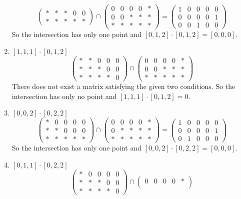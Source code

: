 \documentclass[letterpaper, 12pt]{article}
\begin{document}
\begin{solution}
\begin{enumerate}[(1)]
\[\begin{pmatrix}
   *&*&*&0&0\\
   *&*&*&*&*
\end{pmatrix}\cap \begin{pmatrix}
   0&0&0&0&*\\
   0&0&*&*&*\\ 
   *&*&*&*&*
\end{pmatrix}=\begin{pmatrix}
   1&0&0&0&0\\ 
   0&0&0&0&1\\ 
   0&0&1&0&0
\end{pmatrix}\]
So the intersection has only one point and \([0,1,2]\cdot [0,1,2]=[0,0,0]\).
\item \([1,1,1]\cdot [0,1,2]\)
\[\begin{pmatrix}
   *&*&0&0&0\\ 
   *&*&*&0&0\\
   *&*&*&*&0
\end{pmatrix}\cap \begin{pmatrix}
   0&0&0&0&*\\
   0&0&*&*&*\\ 
   *&*&*&*&*
\end{pmatrix}\]
There does not exist a matrix satisfying the given two conditions. So the intersection has only no point and \([1,1,1]\cdot [0,1,2]=0\).
\item \([0,0,2]\cdot [0,2,2]\)
\[\begin{pmatrix}
   *&0&0&0&0\\ 
   *&*&0&0&0\\
   *&*&*&*&*
\end{pmatrix}\cap \begin{pmatrix}
   0&0&0&0&*\\
   0&*&*&*&*\\ 
   *&*&*&*&*
\end{pmatrix}=\begin{pmatrix}
   1&0&0&0&0\\ 
   0&0&0&0&1\\ 
   0&1&0&0&0
\end{pmatrix}\]
So the intersection has only one point and \([0,0,2]\cdot [0,2,2]=[0,0,0]\).
\item \([0,1,1]\cdot [0,2,2]\)
\[\begin{pmatrix}
   *&0&0&0&0\\ 
   *&*&*&0&0\\
   *&*&*&*&0
\end{pmatrix}\cap \begin{pmatrix}
   0&0&0&0&*\\

\end{pmatrix}\]
\end{enumerate}
\end{solution}
\end{document}
